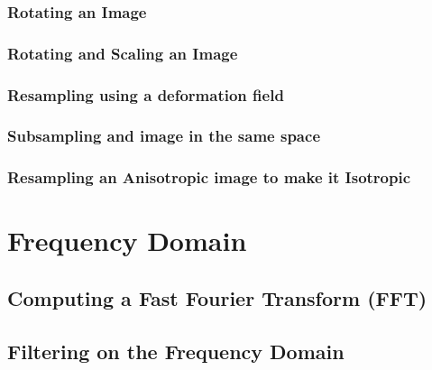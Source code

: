 \subsubsection{Rotating an Image}
\ifitkFullVersion

\fi

\subsubsection{Rotating and Scaling an Image}
\ifitkFullVersion

\fi

\subsubsection{Resampling using a deformation field}
\ifitkFullVersion

\fi


\subsubsection{Subsampling and image in the same space}
\label{SubsampleVolume}

\ifitkFullVersion

\fi



\subsubsection{Resampling an Anisotropic image to make it Isotropic}
\label{ResampleVolumesToBeIsotropic}

\ifitkFullVersion

\fi



\section{Frequency Domain}
\label{sec:FrequencyDomain}


\subsection{Computing a Fast Fourier Transform (FFT)}
\label{FFTImageFilter}

\ifitkFullVersion

\fi


\subsection{Filtering on the Frequency Domain}
\label{FFTImageFilterFourierDomainFiltering}

